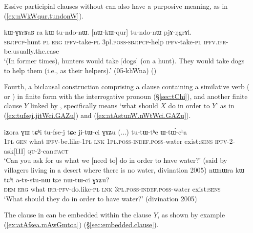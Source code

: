 Essive participial clauses without  can also have a purposive meaning, as in (\ref{ex:nWkWqur.tundonW}).

\begin{exe}
\ex \label{ex:nWkWqur.tundonW}
\gll  kɯ-ɣɤrʁaʁ ra kɯ tu-ndo-nɯ. [nɯ-kɯ-qur] tu-ndo-nɯ pjɤ-ŋgrɤl. \\
\textsc{sbj}:\textsc{pcp}-hunt \textsc{pl} \textsc{erg} \textsc{ipfv}-take-\textsc{pl} 3pl.\textsc{poss}-\textsc{sbj}:\textsc{pcp}-help \textsc{ipfv}-take-\textsc{pl} \textsc{ipfv}.\textsc{ifr}-be.usually.the.case \\
\glt `(In former times), hunters would take [dogs] (on a hunt). They would take dogs to help them (i.e., as their helpers).' (05-khWna)
()
\end{exe}

Fourth, a biclausal construction comprising a clause containing a similative verb ( or ) in finite form with the interrogative pronoun (§\ref{sec:tChi}), and another finite clause $Y$ linked by , specifically means `what should $X$ do in order to $Y$' as in (\ref{ex:tufsej.jitWci.GAZu}) and (\ref{ex:atAstunW.nWtWci.GAZu}).

 \begin{exe}
 \ex  
 \begin{xlist}
\ex \label{ex:tufsej.jitWci.GAZu}
\gll  iʑora ɣɯ tɕʰi tu-fse-j tɕe ji-tɯ-ci ɣɤʑu (...) tu-tɯ-tʰe ɯ-tɯ́-cʰa \\
\textsc{1pl} \textsc{gen} what \textsc{ipfv}-be.like-\textsc{1pl} \textsc{lnk} \textsc{1pl}.\textsc{poss}-\textsc{indef}.\textsc{poss}-water exist:\textsc{sens} { } \textsc{ipfv}-2-ask[III] \textsc{qu}-2-can:\textsc{fact} \\
\glt `Can you ask for us what we [need to] do in order to have water?' (said by villagers living in a desert where there is no water, divination 2005)
\ex \label{ex:atAstunW.nWtWci.GAZu}
\gll nɯnɯra kɯ tɕʰi a-tɤ-stu-nɯ tɕe nɯ-tɯ-ci ɣɤʑu? \\
\textsc{dem} \textsc{erg} what \textsc{irr}-\textsc{pfv}-do.like-\textsc{pl} \textsc{lnk} \textsc{3pl}.\textsc{poss}-\textsc{indef}.\textsc{poss}-water exist:\textsc{sens} \\
\glt `What should they do in order to have water?' (divination 2005)
 \end{xlist}
\end{exe} 

 The clause in  can be embedded within the clause $Y$, as shown by example (\ref{ex:atAfsea.mAwGmtoa}) (§\ref{sec:embedded.clause}).


